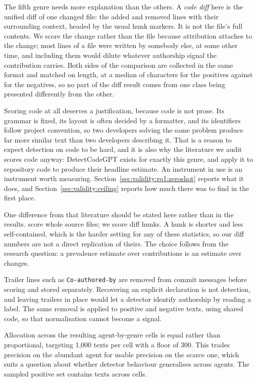 The fifth genre needs more explanation than the others. A \emph{code diff} here is the
unified diff of one changed file: the added and removed lines with their surrounding
context, headed by the usual hunk markers. It is not the file's full contents. We score
the change rather than the file because attribution attaches to the change; most lines
of a file were written by somebody else, at some other time, and including them would
dilute whatever authorship signal the contribution carries. Both sides of the comparison
are collected in the same format and matched on length, at a median of
 characters for the positives against  for the negatives, so
no part of the diff result comes from one class being presented differently from the
other.

Scoring code at all deserves a justification, because code is not prose. Its grammar is
fixed, its layout is often decided by a formatter, and its identifiers follow project
convention, so two developers solving the same problem produce far more similar text
than two developers describing it. That is a reason to expect detection on code to be
hard, and it is also why the literature we audit scores code anyway: DetectCodeGPT
exists for exactly this genre, and \citet{ji2026exploratory} apply it to repository code
to produce their headline estimate. An instrument in use is an instrument worth
measuring. Section~\ref{sec:validity:rq1:zeroshot} reports what it does, and
Section~\ref{sec:validity:ceiling} reports how much there was to find in the first
place.

One difference from that literature should be stated here rather than in the results.
\citet{ji2026exploratory} score whole source files; we score diff hunks. A hunk is
shorter and less self-contained, which is the harder setting for any of these
statistics, so our diff numbers are not a direct replication of theirs. The choice
follows from the research question: a prevalence estimate over contributions is an
estimate over changes.

Trailer lines such as \texttt{Co-authored-by} are removed from commit messages before
scoring and stored separately. Recovering an explicit declaration is not detection, and
leaving trailers in place would let a detector identify authorship by reading a label.
The same removal is applied to positive and negative texts, using shared code, so that
normalisation cannot become a signal.

Allocation across the resulting agent-by-genre cells is equal rather than proportional,
targeting 1{,}000 texts per cell with a floor of 300. This trades precision on the
abundant agent for usable precision on the scarce one, which suits a question about
whether detector behaviour generalises across agents. The sampled positive set contains
\PositiveTexts{} texts across \PositiveCells{} cells.

